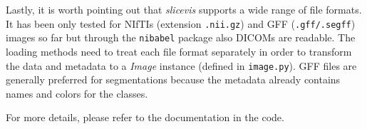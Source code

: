 Lastly, it is worth pointing out that \emph{slicevis} supports a wide range of file formats. It has been only tested for NIfTIs (extension \texttt{.nii.gz}) and GFF (\texttt{.gff/.segff}) images so far but through the \texttt{nibabel} package also DICOMs are readable. The loading methods need to treat each file format separately in order to transform the data and metadata to a \emph{Image} instance (defined in \texttt{image.py}). GFF files are generally preferred for segmentations because the metadata already contains names and colors for the classes.

For more details, please refer to the documentation in the code.